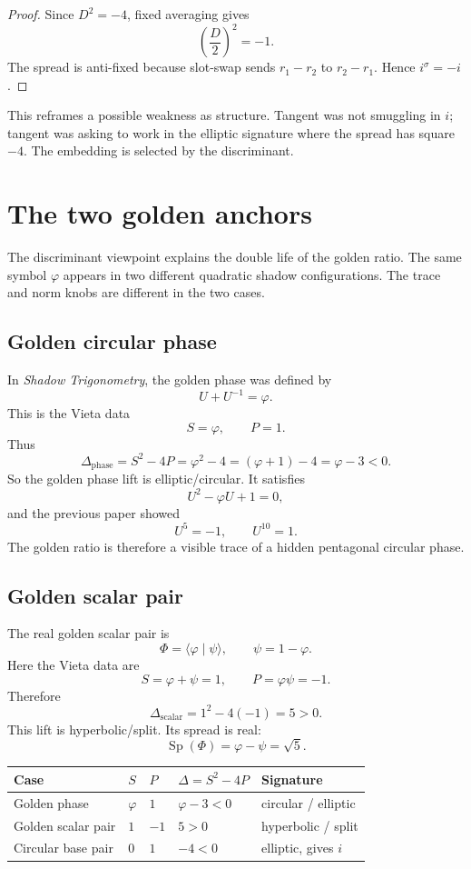 \documentclass[11pt]{article}
\newcommand{\Sp}{\operatorname{Sp}}
\newcommand{\sig}{\sigma}
\newcommand{\ph}{\varphi}
\newcommand{\ps}{\psi}
\begin{document}
\begin{proof}
Since $D^2=-4$, fixed averaging gives
\[
    \left(\frac{D}{2}\right)^2=-1.
\]
The spread is anti-fixed because slot-swap sends $r_1-r_2$ to $r_2-r_1$.  Hence $i^\sig=-i$.
\end{proof}

This reframes a possible weakness as structure.  Tangent was not smuggling in $i$; tangent was asking to work in the elliptic signature where the spread has square $-4$.  The embedding is selected by the discriminant.

\section{The two golden anchors}

The discriminant viewpoint explains the double life of the golden ratio.  The same symbol $\ph$ appears in two different quadratic shadow configurations.  The trace and norm knobs are different in the two cases.

\subsection{Golden circular phase}

In \emph{Shadow Trigonometry}, the golden phase was defined by
\[
    U+U^{-1}=\ph.
\]
This is the Vieta data
\[
    S=\ph,
    \qquad
    P=1.
\]
Thus
\[
    \Delta_{\mathrm{phase}}
    =S^2-4P
    =\ph^2-4
    =(\ph+1)-4
    =\ph-3<0.
\]
So the golden phase lift is elliptic/circular.  It satisfies
\[
    U^2-\ph U+1=0,
\]
and the previous paper showed
\[
    U^5=-1,
    \qquad
    U^{10}=1.
\]
The golden ratio is therefore a visible trace of a hidden pentagonal circular phase.

\subsection{Golden scalar pair}

The real golden scalar pair is
\[
    \Phi=\langle\ph\mid\ps\rangle,
    \qquad
    \ps=1-\ph.
\]
Here the Vieta data are
\[
    S=\ph+\ps=1,
    \qquad
    P=\ph\ps=-1.
\]
Therefore
\[
    \Delta_{\mathrm{scalar}}
    =1^2-4(-1)=5>0.
\]
This lift is hyperbolic/split.  Its spread is real:
\[
    \Sp(\Phi)=\ph-\ps=\sqrt5.
\]

\begin{center}
\begin{tabular}{lllll}
\toprule
Case & $S$ & $P$ & $\Delta=S^2-4P$ & Signature \\
\midrule
Golden phase & $\ph$ & $1$ & $\ph-3<0$ & circular / elliptic \\
Golden scalar pair & $1$ & $-1$ & $5>0$ & hyperbolic / split \\
Circular base pair & $0$ & $1$ & $-4<0$ & elliptic, gives $i$ \\
\bottomrule
\end{tabular}
\end{center}
\end{document}
